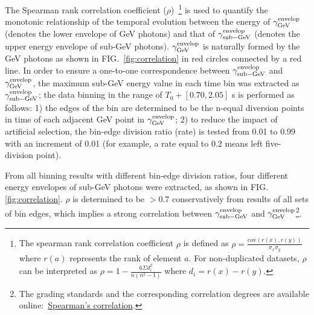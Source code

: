 \documentclass[prd,twocolumn,amsmath,amssymb,aps]{revtex4-2} %
\begin{document}
The Spearman rank correlation coefficient ($\rho$)~\citep{spearman}\footnote{The spearman rank correlation coefficient $\rho$ is defined as $\rho = \frac{\mathrm{cov}(r(x),r(y))}{\sigma_x \sigma_y} $ where $r(a)$ represents the rank of element $a$. For non-duplicated datasets, $\rho$ can be interpreted as $\rho = 1 - \frac{6 \Sigma d^2_i}{n(n^2-1)} $ where $d_i = r(x) - r(y)$.} is used to quantify the monotonic relationship of the temporal evolution between the energy of $\gamma^{\rm envelop}_{\rm GeV}$ (denotes the lower envelope of GeV photons) and that of $\gamma^{\rm envelop}_{\rm sub-GeV}$ (denotes the upper energy envelope of sub-GeV photons). $\gamma^{\rm envelop}_{\rm GeV}$ is naturally formed by the GeV photons as shown in FIG.~\ref{fig:correlation} in red circles connected by a red line.
In order to ensure a one-to-one correspondence between $\gamma^{\rm envelop}_{\rm sub-GeV}$ and $\gamma^{\rm envelop}_{\rm GeV}$, the maximum sub-GeV energy value in each time bin was extracted as $\gamma^{\rm envelop}_{\rm sub-GeV}$; the data binning in the range of $T_0+[0.70, 2.05]$ s is performed as follows: 1) the edges of the bin are determined to be the n-equal diversion points in time of each adjacent GeV point in $\gamma^{\rm envelop}_{\rm GeV}$; 2) to reduce the impact of artificial selection, the bin-edge division ratio (rate) is tested from 0.01 to 0.99 with an increment of 0.01 (for example, a rate equal to 0.2 means left five-division point). 

From all binning results with different bin-edge division ratios, four different energy envelopes of sub-GeV photons were extracted, as shown in FIG.\ref{fig:correlation}. $\rho$ is determined to be $> 0.7$ conservatively from results of all sets of bin edges, which implies a strong correlation between $\gamma^{\rm envelop}_{\rm sub-GeV}$ and $\gamma^{\rm envelop}_{\rm GeV}$\footnote{The grading standards and the corresponding correlation degrees are available online:~\href{https://www.statstutor.ac.uk/resources/uploaded/spearmans.pdf}{Spearman's correlation}. }.
\end{document}

